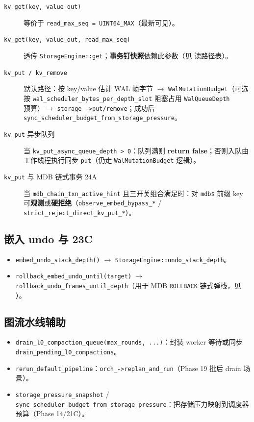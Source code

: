\begin{description}
  \item[\texttt{kv\_get(key, value\_out)}] 等价于 \texttt{read\_max\_seq = UINT64\_MAX}（最新可见）。
  \item[\texttt{kv\_get(key, value\_out, read\_max\_seq)}] 透传 \texttt{StorageEngine::get}；\textbf{事务钉快照}依赖此参数（见  读路径表）。
  \item[\texttt{kv\_put / kv\_remove}] 默认路径：按 key/value 估计 WAL 帧字节 $\rightarrow$ \texttt{WalMutationBudget}（可选按 \texttt{wal\_scheduler\_bytes\_per\_depth\_slot} 阻塞占用 \texttt{WalQueueDepth} 预算）$\rightarrow$ \texttt{storage\_->put/remove}；成功后 \texttt{sync\_scheduler\_budget\_from\_storage\_pressure}。
  \item[\texttt{kv\_put} 异步队列] 当 \texttt{kv\_put\_async\_queue\_depth > 0}：队列满则 \textbf{return false}；否则入队由工作线程执行同步 \texttt{put}（仍走 \texttt{WalMutationBudget} 逻辑）。
  \item[\texttt{kv\_put} 与 MDB 链式事务 24A] 当 \texttt{mdb\_chain\_txn\_active\_hint} 且三开关组合满足时：对 \texttt{mdb\$} 前缀 key 可\textbf{观测}或\textbf{硬拒绝}（\texttt{observe\_embed\_bypass\_*} / \texttt{strict\_reject\_direct\_kv\_put\_*}）。
\end{description}

\subsection{嵌入 undo 与 23C}

\begin{itemize}
  \item \texttt{embed\_undo\_stack\_depth()} $\rightarrow$ \texttt{StorageEngine::undo\_stack\_depth}。
  \item \texttt{rollback\_embed\_undo\_until(target)} $\rightarrow$ \texttt{rollback\_undo\_frames\_until\_depth}（用于 MDB \texttt{ROLLBACK} 链式弹栈，见 ）。
\end{itemize}

\subsection{图流水线辅助}

\begin{itemize}
  \item \texttt{drain\_l0\_compaction\_queue(max\_rounds, ...)}：封装 worker 等待或同步 \texttt{drain\_pending\_l0\_compactions}。
  \item \texttt{rerun\_default\_pipeline}：\texttt{orch\_->replan\_and\_run}（Phase 19 批后 drain 场景）。
  \item \texttt{storage\_pressure\_snapshot} / \texttt{sync\_scheduler\_budget\_from\_storage\_pressure}：把存储压力映射到调度器预算（Phase 14/21C）。
\end{itemize}

